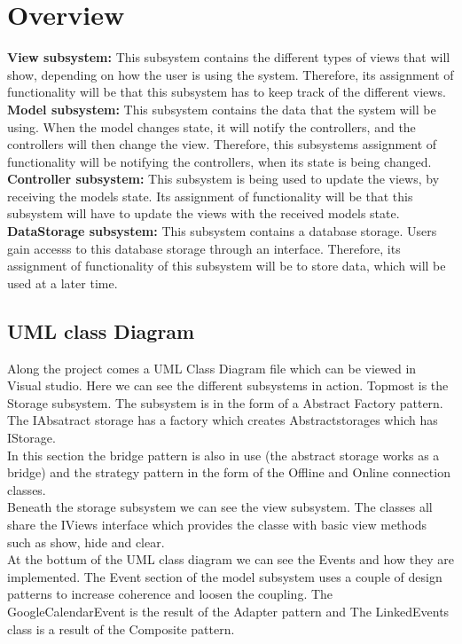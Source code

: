 \section{Overview}
\textbf{View subsystem:}
This subsystem contains the different types of views that will show, depending on how the user is 
using the system. Therefore, its assignment of functionality will be that this subsystem 
has to keep track of the different views.\\
\textbf{Model subsystem:}
This subsystem contains the data that the system will be using. When the model changes state, 
it will notify the controllers, and the controllers will then change the view. Therefore, 
this subsystems assignment of functionality will be notifying the controllers, 
when its state is being changed.\\
\textbf{Controller subsystem:}
This subsystem is being used to update the views, by receiving the models state. 
Its assignment of functionality will be that this subsystem will have to update the views 
with the received models state.\\
\textbf{DataStorage subsystem:}
This subsystem contains a database storage. Users gain accesss to this database storage through an interface.
Therefore, its assignment of functionality of this subsystem will be to store data, which will be used at a later time.

\subsection{UML class Diagram}
Along the project comes a UML Class Diagram file which can be viewed in Visual studio. Here we can see the different subsystems in action. Topmost is the Storage subsystem. The subsystem is in the form of a Abstract Factory pattern. The IAbsatract storage has a factory which creates Abstractstorages which has IStorage. \\In this section the bridge pattern is also in use (the abstract storage works as a bridge) and the strategy pattern in the form of the Offline and Online connection classes.\\

Beneath the storage subsystem we can see the view subsystem. The classes all share the IViews interface which provides the classe with basic view methods such as show, hide and clear.\\

At the bottum of the UML class diagram we can see the Events and how they are implemented. The Event section of the model subsystem uses a couple of design patterns to increase coherence and loosen the coupling. The GoogleCalendarEvent is the result of the Adapter pattern and The LinkedEvents class is a result of the Composite pattern.